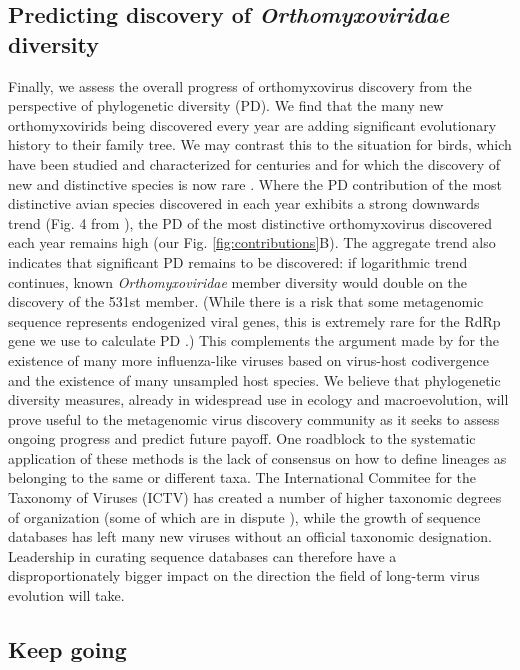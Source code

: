 \documentclass[11pt]{article}
\begin{document}
\subsection{Predicting discovery of \textit{Orthomyxoviridae} diversity}

Finally, we assess the overall progress of orthomyxovirus discovery from the perspective of phylogenetic diversity (PD).
We find that the many new orthomyxovirids being discovered every year are adding significant evolutionary history to their family tree.
We may contrast this to the situation for birds, which have been studied and characterized for centuries and for which the discovery of new and distinctive species is now rare \citep{lum_tracking_2022}.
Where the PD contribution of the most distinctive avian species discovered in each year exhibits a strong downwards trend (Fig. 4 from \citep{lum_tracking_2022}), the PD of the most distinctive orthomyxovirus discovered each year remains high (our Fig. \ref{fig:contributions}B).
The aggregate trend also indicates that significant PD remains to be discovered: if logarithmic trend continues, known \textit{Orthomyxoviridae} member diversity would double on the discovery of the 531st member.
(While there is a risk that some metagenomic sequence represents endogenized viral genes, this is extremely rare for the RdRp gene we use to calculate PD \citep{whitfield_diversity_2017}.)
This complements the argument made by \citep{parry_divergent_2020} for the existence of many more influenza-like viruses based on virus-host codivergence and the existence of many unsampled host species.
We believe that phylogenetic diversity measures, already in widespread use in ecology and macroevolution, will prove useful to the metagenomic virus discovery community as it seeks to assess ongoing progress and predict future payoff.
One roadblock to the systematic application of these methods is the lack of consensus on how to define lineages as belonging to the same or different taxa.
The International Commitee for the Taxonomy of Viruses (ICTV) has created a number of higher taxonomic degrees of organization (some of which are in dispute \citep{holmes_can_2019}), while the growth of sequence databases has left many new viruses without an official taxonomic designation.
Leadership in curating sequence databases can therefore have a disproportionately bigger impact on the direction the field of long-term virus evolution will take.


\subsection{Keep going}
\end{document}
